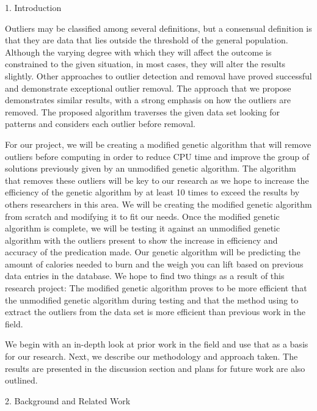 \documentclass[conference]{IEEEtran}
\begin{document}
\large 1. Introduction

Outliers may be classified among several definitions, but a consensual definition is that they are data that lies outside the threshold of the general population. Although the varying degree with which they will affect the outcome is constrained to the given situation, in most cases, they will alter the results slightly. Other approaches to outlier detection and removal have proved successful and demonstrate exceptional outlier removal. The approach that we propose demonstrates similar results, with a strong emphasis on how the outliers are removed. The proposed algorithm traverses the given data set looking for patterns and considers each outlier before removal.

For our project, we will be creating a modified genetic algorithm that will remove outliers before computing in order to reduce CPU time and improve the group of solutions previously given by an unmodified genetic algorithm. The algorithm that removes these outliers will be key to our research as we hope to increase the efficiency of the genetic algorithm by at least 10 times to exceed the results by others researchers in this area. We will be creating the modified genetic algorithm from scratch and modifying it to fit our needs. Once the modified genetic algorithm is complete, we will be testing it against an unmodified genetic algorithm with the outliers present to show the increase in efficiency and accuracy of the predication made. Our genetic algorithm will be predicting the amount of calories needed to burn and the weigh you can lift based on previous data entries in the database. We hope to find two things as a result of this research project: The modified genetic algorithm proves to be more efficient that the unmodified genetic algorithm during testing and that the method using to extract the outliers from the data set is more efficient than previous work in the field. 

We begin with an in-depth look at prior work in the field and use that as a basis for our research. Next, we describe our methodology and approach taken. The results are presented in the discussion section and plans for future work are also outlined. 



\large 2. Background and Related Work
\end{document}
